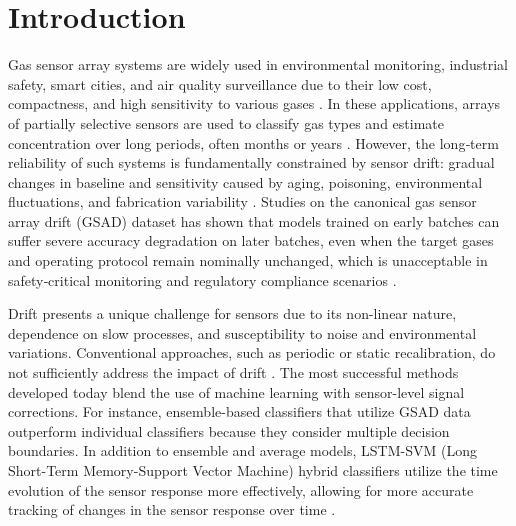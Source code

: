\documentclass{IEEE_lsens}
\begin{document}
\maketitle
\section{Introduction}
Gas sensor array systems are widely used in environmental monitoring, industrial safety, smart cities, and air quality surveillance due to their low cost, compactness, and high sensitivity to various gases \cite{dutta2023road}. In these applications, arrays of partially selective sensors are used to classify gas types and estimate concentration over long periods, often months or years \cite{vergara2012chemical}. However, the long‑term reliability of such systems is fundamentally constrained by sensor drift: gradual changes in baseline and sensitivity caused by aging, poisoning, environmental fluctuations, and fabrication variability \cite{dennler2022drift}. Studies on the canonical gas sensor array drift (GSAD) dataset has shown that models trained on early batches can suffer severe accuracy degradation on later batches, even when the target gases and operating protocol remain nominally unchanged, which is unacceptable in safety‑critical monitoring and regulatory compliance scenarios \cite{vergara2012chemical,dennler2022drift}.

Drift presents a unique challenge for sensors due to its non-linear nature, dependence on slow processes, and susceptibility to noise and environmental variations. Conventional approaches, such as periodic or static recalibration, do not sufficiently address the impact of drift \cite{dennler2022drift}. The most successful methods developed today blend the use of machine learning with sensor-level signal corrections. For instance, ensemble-based classifiers that utilize GSAD data outperform individual classifiers because they consider multiple decision boundaries. In addition to ensemble and average models, LSTM-SVM (Long Short-Term Memory-Support Vector Machine) hybrid classifiers utilize the time evolution of the sensor response more effectively, allowing for more accurate tracking of changes in the sensor response over time \cite{vergara2012chemical, zhao2019sensor}. 
\end{document}
